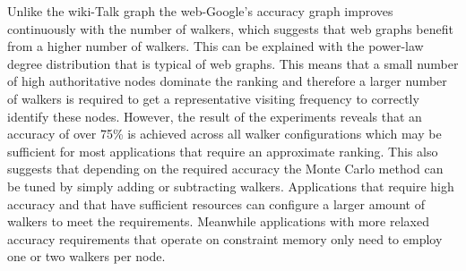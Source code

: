 Unlike the wiki-Talk graph the web-Google's accuracy graph improves continuously with the number of walkers, which suggests that web graphs benefit from a higher number of walkers. This can be explained with the power-law degree distribution that is typical of web graphs. This means that a small number of high authoritative nodes dominate the ranking and therefore a larger number of walkers is required to get a representative visiting frequency to correctly identify these nodes. However, the result of the experiments reveals that an accuracy of over 75\% is achieved across all walker configurations which may be sufficient for most applications that require an approximate ranking. This also suggests that depending on the required accuracy the Monte Carlo method can be tuned by simply adding or subtracting walkers. Applications that require high accuracy and that have sufficient resources can configure a larger amount of walkers to meet the requirements. Meanwhile applications with more relaxed accuracy requirements that operate on constraint memory only need to employ one or two walkers per node.  

